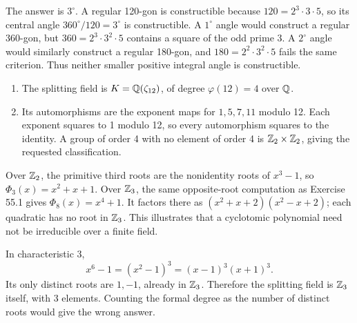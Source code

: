 The answer is $3^\circ$. A regular 120-gon is constructible because $120=2^3\cdot3\cdot5$, so its central angle $360^\circ/120=3^\circ$ is constructible. A $1^\circ$ angle would construct a regular 360-gon, but $360=2^3\cdot3^2\cdot5$ contains a square of the odd prime 3. A $2^\circ$ angle would similarly construct a regular 180-gon, and $180=2^2\cdot3^2\cdot5$ fails the same criterion. Thus neither smaller positive integral angle is constructible.

\begin{enumerate}[label=(\alph*)]
\item The splitting field is $K=\mathbb{Q}(\zeta_{12})$, of degree $\varphi(12)=4$ over $\mathbb{Q}$.
\item Its automorphisms are the exponent maps for $1,5,7,11$ modulo 12. Each exponent squares to 1 modulo 12, so every automorphism squares to the identity. A group of order 4 with no element of order 4 is $\mathbb{Z}_2\times\mathbb{Z}_2$, giving the requested classification.
\end{enumerate}

Over $\mathbb{Z}_2$, the primitive third roots are the nonidentity roots of $x^3-1$, so $\Phi_3(x)=x^2+x+1$. Over $\mathbb{Z}_3$, the same opposite-root computation as Exercise 55.1 gives $\Phi_8(x)=x^4+1$. It factors there as $(x^2+x+2)(x^2-x+2)$; each quadratic has no root in $\mathbb{Z}_3$. This illustrates that a cyclotomic polynomial need not be irreducible over a finite field.

In characteristic 3,
\[x^6-1=(x^2-1)^3=(x-1)^3(x+1)^3.\]
Its only distinct roots are $1,-1$, already in $\mathbb{Z}_3$. Therefore the splitting field is $\mathbb{Z}_3$ itself, with 3 elements. Counting the formal degree as the number of distinct roots would give the wrong answer.

